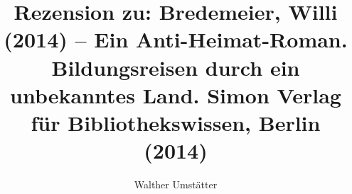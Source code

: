 
\fancyhead[R]{\thepage} %

\title{\LARGE{Rezension zu: Bredemeier, Willi (2014) – Ein Anti-Heimat-Roman. Bildungsreisen durch ein unbekanntes Land. Simon Verlag für Bibliothekswissen, Berlin (2014)}} %
\author{Walther Umstätter} %

\setcounter{page}{94}
